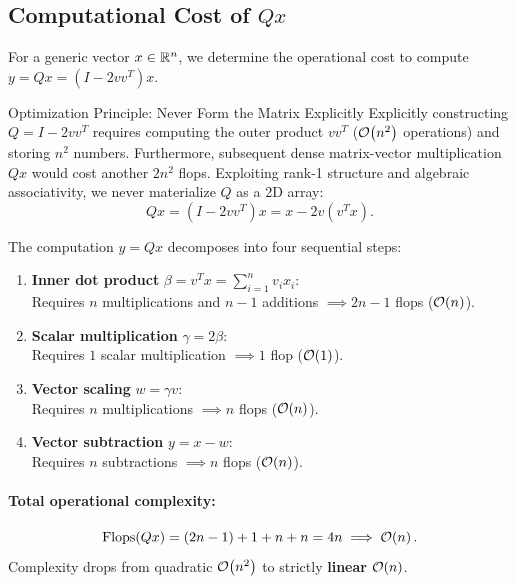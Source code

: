 \subsection{Computational Cost of $Q x$}
For a generic vector $x \in \mathbb{R}^n$, we determine the operational cost to compute $y = Q x = (I - 2 v v^T) x$.

\begin{alertblock}{Optimization Principle: Never Form the Matrix Explicitly}
Explicitly constructing $Q = I - 2 v v^T$ requires computing the outer product $v v^T$ ($\mathcal{O}\!\left(n^2\right)$ operations) and storing $n^2$ numbers. Furthermore, subsequent dense matrix-vector multiplication $Q x$ would cost another $2n^2$ flops.
Exploiting rank-1 structure and algebraic associativity, we never materialize $Q$ as a 2D array:
\begin{equation}
    Q x = (I - 2 v v^T) x = x - 2 v (v^T x).
    \label{eq:eval-vector-householder-en}
\end{equation}
\end{alertblock}

The computation $y = Q x$ decomposes into four sequential steps:
\begin{enumerate}
    \item \textbf{Inner dot product} $\beta = v^T x = \sum_{i=1}^n v_i x_i$:\\
    Requires $n$ multiplications and $n - 1$ additions $\implies 2n - 1$ flops ($\mathcal{O}\!\left(n\right)$).
    \item \textbf{Scalar multiplication} $\gamma = 2 \beta$:\\
    Requires $1$ scalar multiplication $\implies 1$ flop ($\mathcal{O}\!\left(1\right)$).
    \item \textbf{Vector scaling} $w = \gamma v$:\\
    Requires $n$ multiplications $\implies n$ flops ($\mathcal{O}\!\left(n\right)$).
    \item \textbf{Vector subtraction} $y = x - w$:\\
    Requires $n$ subtractions $\implies n$ flops ($\mathcal{O}\!\left(n\right)$).
\end{enumerate}

\paragraph{Total operational complexity:}
\begin{equation}
    \text{Flops}(Q x) = (2n - 1) + 1 + n + n = 4n \implies \mathcal{O}\!\left(n\right).
\end{equation}
Complexity drops from quadratic $\mathcal{O}\!\left(n^2\right)$ to strictly \textbf{linear} $\mathcal{O}\!\left(n\right)$.

